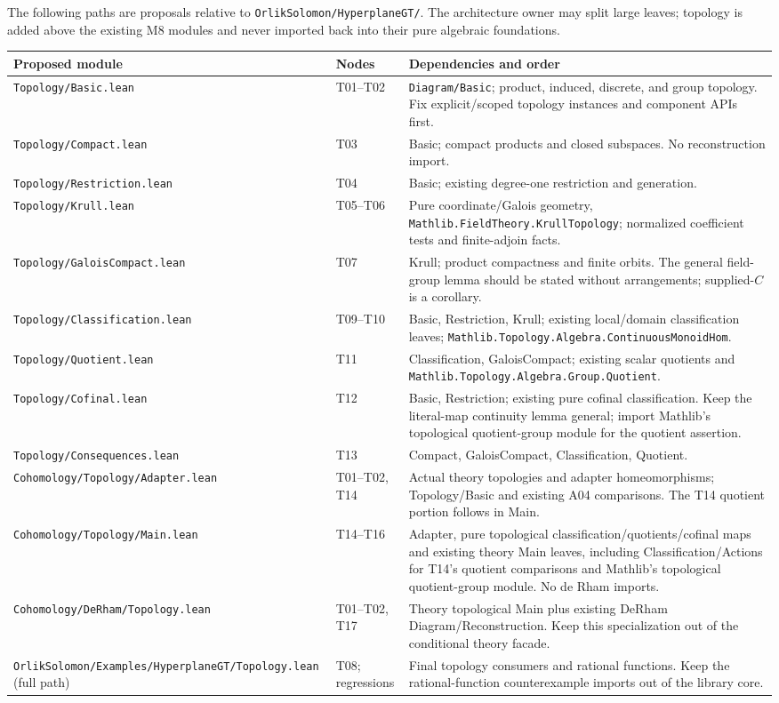 \documentclass[11pt]{article}
\theoremstyle{remark}\newtheorem{remark}[theorem]{Remark}
\newcommand{\code}[1]{{\normalfont\nolinkurl{#1}}}
\begin{document}
The following paths are proposals relative to
\code{OrlikSolomon/HyperplaneGT/}. The architecture owner may split
large leaves; topology is added above the existing M8 modules and
never imported back into their pure algebraic foundations.
\small
\begin{longtable}{@{}p{}p{}p{}@{}}
\toprule Proposed module & Nodes & Dependencies and order\\\midrule\endhead
\code{Topology/Basic.lean}&T01--T02&
\code{Diagram/Basic}; product, induced, discrete, and group topology.
Fix explicit/scoped topology instances and component APIs first.\\
\code{Topology/Compact.lean}&T03&
Basic; compact products and closed subspaces. No reconstruction import.\\
\code{Topology/Restriction.lean}&T04&
Basic; existing degree-one restriction and generation.\\
\code{Topology/Krull.lean}&T05--T06&
Pure coordinate/Galois geometry, \code{Mathlib.FieldTheory.KrullTopology};
normalized coefficient tests and finite-adjoin facts.\\
\code{Topology/GaloisCompact.lean}&T07&
Krull; product compactness and finite orbits. The general field-group
lemma should be stated without arrangements; supplied-$C$ is a corollary.\\
\code{Topology/Classification.lean}&T09--T10&
Basic, Restriction, Krull; existing local/domain classification leaves;
\code{Mathlib.Topology.Algebra.ContinuousMonoidHom}.\\
\code{Topology/Quotient.lean}&T11&
Classification, GaloisCompact; existing scalar quotients and
\code{Mathlib.Topology.Algebra.Group.Quotient}.\\
\code{Topology/Cofinal.lean}&T12&
Basic, Restriction; existing pure cofinal classification. Keep the
literal-map continuity lemma general; import Mathlib's topological
quotient-group module for the quotient assertion.\\
\code{Topology/Consequences.lean}&T13&
Compact, GaloisCompact, Classification, Quotient.\\
\code{Cohomology/Topology/Adapter.lean}&T01--T02, T14&
Actual theory topologies and adapter homeomorphisms; Topology/Basic
and existing A04 comparisons. The T14 quotient portion follows in Main.\\
\code{Cohomology/Topology/Main.lean}&T14--T16&
Adapter, pure topological classification/quotients/cofinal maps and
existing theory Main leaves, including Classification/Actions for
T14's quotient comparisons and Mathlib's topological quotient-group
module. No de Rham imports.\\
\code{Cohomology/DeRham/Topology.lean}&T01--T02, T17&
Theory topological Main plus existing DeRham Diagram/Reconstruction.
Keep this specialization out of the conditional theory facade.\\
\code{OrlikSolomon/Examples/HyperplaneGT/Topology.lean} (full path)&T08;
regressions&
Final topology consumers and rational functions. Keep the rational-function
counterexample imports out of the library core.\\
\bottomrule
\end{longtable}
\normalsize
\end{document}
